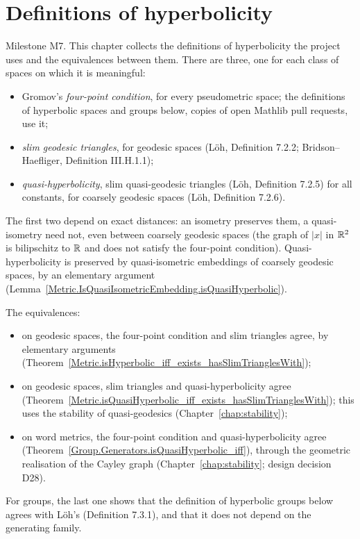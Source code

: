 \chapter{Definitions of hyperbolicity}
\label{chap:hyperbolic}

Milestone M7. This chapter collects the definitions of hyperbolicity the project uses and the
equivalences between them. There are three, one for each class of spaces on which it is meaningful:
\begin{itemize}
  \item Gromov's \emph{four-point condition}, for every pseudometric space; the definitions of
        hyperbolic spaces and groups below, copies of open Mathlib pull requests, use it;
  \item \emph{slim geodesic triangles}, for geodesic spaces (L\"oh, Definition 7.2.2;
        Bridson--Haefliger, Definition III.H.1.1);
  \item \emph{quasi-hyperbolicity}, slim quasi-geodesic triangles (L\"oh, Definition 7.2.5) for
        all constants, for coarsely geodesic spaces (L\"oh, Definition 7.2.6).
\end{itemize}
The first two depend on exact distances: an isometry preserves them, a quasi-isometry need not,
even between coarsely geodesic spaces (the graph of $|x|$ in $\mathbb{R}^2$ is bilipschitz to $\mathbb{R}$ and
does not satisfy the four-point condition). Quasi-hyperbolicity is preserved by quasi-isometric
embeddings of coarsely geodesic spaces, by an elementary argument
(Lemma~\ref{Metric.IsQuasiIsometricEmbedding.isQuasiHyperbolic}).

The equivalences:
\begin{itemize}
  \item on geodesic spaces, the four-point condition and slim triangles agree, by elementary
        arguments (Theorem~\ref{Metric.isHyperbolic_iff_exists_hasSlimTrianglesWith});
  \item on geodesic spaces, slim triangles and quasi-hyperbolicity agree
        (Theorem~\ref{Metric.isQuasiHyperbolic_iff_exists_hasSlimTrianglesWith}); this uses the
        stability of quasi-geodesics (Chapter~\ref{chap:stability});
  \item on word metrics, the four-point condition and quasi-hyperbolicity agree
        (Theorem~\ref{Group.Generators.isQuasiHyperbolic_iff}), through the geometric realisation of
        the Cayley graph (Chapter~\ref{chap:stability}; design decision D28).
\end{itemize}
For groups, the last one shows that the definition of hyperbolic groups below agrees with L\"oh's
(Definition 7.3.1), and that it does not depend on the generating family.

